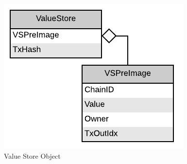 \begin{figure}[H]
    \centering
    \includegraphics[scale=0.5]{figures/ValueStore_Object.pdf}
    \caption{Value Store Object}
\end{figure}

